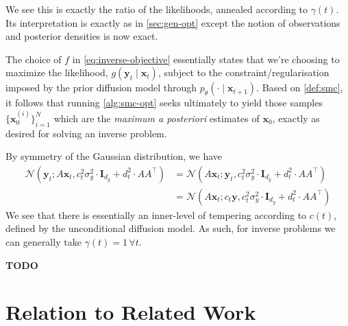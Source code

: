 We see this is exactly the ratio of the likelihoods, annealed according to $\gamma(t)$. Its
interpretation is exactly as in \autoref{sec:gen-opt} except the notion of observations and posterior
densities is now exact.

\begin{remark}[MAP]
    The choice of $f$ in \autoref{eq:inverse-objective} essentially states that
    we're choosing to maximize the likelihood, $g(\mathbf{y}_t \mid \mathbf{x}_t)$, subject to the
    constraint/regularisation imposed by the prior diffusion model through
    $p_\theta(\cdot \mid \mathbf{x}_{t+1})$. Based on \ref{def:smc}, it follows that running
    \autoref{alg:smc-opt} seeks ultimately to yield those samples $\{\mathbf{x}_0^{(i)}\}_{i=1}^N$
    which are the \emph{maximum a posteriori} estimates of $\mathbf{x}_0$, exactly as desired for
    solving an inverse problem.
\end{remark}

\begin{remark}
    By symmetry of the Gaussian distribution, we have
    \begin{align*}
        \mathcal{N}(\mathbf{y}_t; A\mathbf{x}_t, c_t^2\sigma_y^2\cdot \mathbf{I}_{d_y} + d_t^2\cdot AA^\top) &= \mathcal{N}(A\mathbf{x}_t; \mathbf{y}_t, c_t^2\sigma_y^2\cdot \mathbf{I}_{d_y} + d_t^2\cdot AA^\top) \\
        &= \mathcal{N}(A\mathbf{x}_t; c_t\mathbf{y}, c_t^2\sigma_y^2\cdot \mathbf{I}_{d_y} + d_t^2\cdot AA^\top)
    \end{align*}
    We see that there is essentially an inner-level of tempering according to $c(t)$, defined by the
    unconditional diffusion model. As such, for inverse problems we can generally take
    $\gamma(t) = 1\, \forall t$.
\end{remark}

\begin{remark}
    \textbf{TODO}
\end{remark}

\section{Relation to Related Work} \label{sec:relation-to-related}

